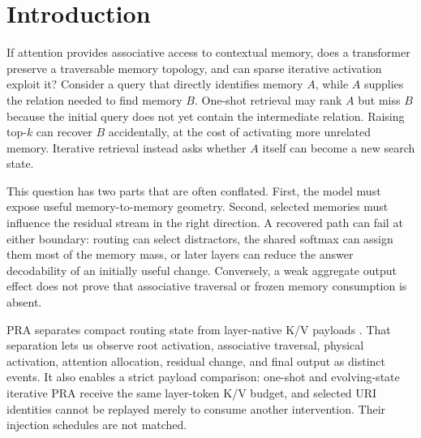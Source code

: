 \begin{abstract}
These results reject absolute consumer incapacity under this intervention but do not establish
reliable reasoning; noisy controlled activation is the leading tested limitation, but attention dilution is
not isolated as its sole mechanism.
Candidate-normalized replay likewise finds no iterative dominance: at matched
deduplicated $K/N$, depth-two iteration trades small complete-recovery gains at
wide budgets for slightly lower mean evidence recall than one-shot retrieval.
Transformer memory contains topology that depends causally on receptive field; the tested iterative
schedule can traverse more of that topology without improving aggregate answers; and frozen
computation can use correctly activated memory in an oracle control.  Isolating evolving-query search
from its layer schedule, making evidence dominate sparse memory influence, and preserving answer
decodability through later layers remain unresolved.
\end{abstract}

\section{Introduction}

If attention provides associative access to contextual memory, does a transformer preserve a
traversable memory topology, and can sparse iterative activation exploit it?  Consider a query that
directly identifies memory $A$, while $A$ supplies the relation needed to find memory $B$.  One-shot
retrieval may rank $A$ but miss $B$ because the initial query does not yet contain the intermediate
relation.  Raising top-$k$ can recover $B$ accidentally, at the cost of activating more unrelated
memory.  Iterative retrieval instead asks whether $A$ itself can become a new search state.

This question has two parts that are often conflated.  First, the model must expose useful
memory-to-memory geometry.  Second, selected memories must influence the residual stream in the
right direction.  A recovered path can fail at either boundary: routing can select distractors, the
shared softmax can assign them most of the memory mass, or later layers can reduce the answer
decodability of an initially useful change.  Conversely, a weak aggregate output effect does not prove that associative traversal or
frozen memory consumption is absent.

PRA separates compact routing state from layer-native K/V payloads
\cite{simao2026pra,simao2026position,simao2026hf}.  That separation lets us observe root activation,
associative traversal, physical activation, attention allocation, residual change, and final output
as distinct events.  It also enables a strict payload comparison: one-shot and evolving-state
iterative PRA receive the same layer-token K/V budget, and selected URI identities cannot be replayed
merely to consume another intervention.  Their injection schedules are not matched.

